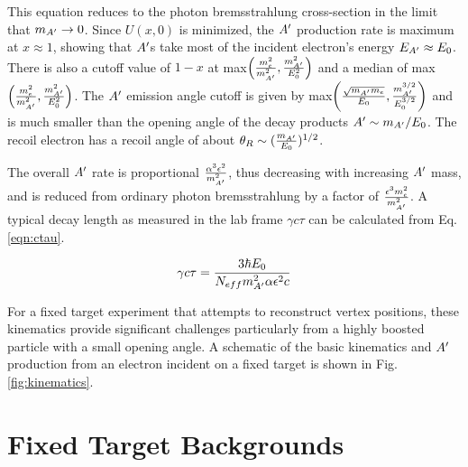 This equation reduces to the photon bremsstrahlung cross-section in the limit that $m_{A^\prime} \rightarrow 0$. Since $U(x,0)$ is minimized, the $A^\prime$ production rate is maximum at $x \approx 1$, showing that $A^\prime$s take most of the incident electron's energy $E_{A^\prime}\approx E_0$. There is also a cutoff value of $1-x$ at max$\left( \frac{m_e^2}{m^2_{A^\prime}},\frac{m^2_{A^\prime}}{E_0^2} \right)$ and a median of max$\left( \frac{m_e^2}{m^2_{A^\prime}},\frac{m^2_{A^\prime}}{E_0^2} \right)$. The $A^\prime$ emission angle cutoff is given by max$\left( \frac{\sqrt{m_{A^\prime}m_e}}{E_0},\frac{m_{A^\prime}^{3/2}}{E_0^{3/2}} \right)$ and is much smaller than the opening angle of the decay products $A^\prime \sim m_{A^\prime}/E_0$. The recoil electron has a recoil angle of about $\theta_{R} \sim (\frac{m_{A^\prime}}{E_0})^{1/2}$.

The overall $A^\prime$ rate is proportional $\frac{\alpha^3 \epsilon^2}{m_{A^\prime}^2}$, thus decreasing with increasing $A^\prime$ mass, and is reduced from ordinary photon bremsstrahlung by a factor of $\frac{\epsilon^3 m_e^2}{m_{A^\prime}^2}$. A typical decay length as measured in the lab frame $\gamma c\tau$ can be calculated from Eq. \ref{eqn:ctau}.

\begin{equation}
    \gamma c\tau=\frac{3\hbar E_0}{N_{eff}m_{A^\prime}^2 \alpha \epsilon^2 c}
    \label{eqn:gammactau}
\end{equation}



 For a fixed target experiment that attempts to reconstruct vertex positions, these kinematics provide significant challenges particularly from a highly boosted particle with a small opening angle. A schematic of the basic kinematics and $A^\prime$ production from an electron incident on a fixed target is shown in Fig. \ref{fig:kinematics}.
 
 \clearpage
 
 \section{Fixed Target Backgrounds}\label{sec:backgrounds}
 
